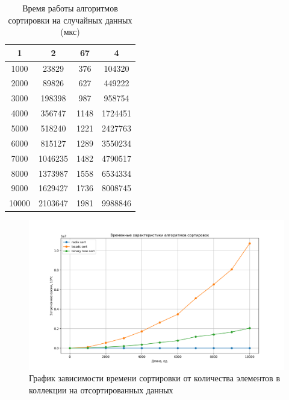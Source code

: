 \begin{table}[h]
	\begin{center}
		\captionsetup{justification=raggedright,singlelinecheck=off}
		\caption{ Время работы алгоритмов сортировки на случайных данных (мкс)}
		\label{tbl:random}
		\begin{tabular}{|c|c|c|c|}
			\hline
			1 & 2 & 67 & 4\\
			\hline
			1000 & 23829 & 376 & 104320\\
			\hline
			2000 & 89826 & 627 & 449222\\
			\hline
			3000 & 198398 & 987 & 958754\\
			\hline
			4000 & 356747 & 1148 & 1724451\\
			\hline
			5000 & 518240 & 1221 & 2427763\\
			\hline
			6000 & 815127 & 1289 & 3550234\\
			\hline
			7000 & 1046235 & 1482 & 4790517\\
			\hline
			8000 & 1373987 & 1558 & 6534334\\
			\hline
			9000 & 1629427 & 1736 & 8008745\\
			\hline
			10000 & 2103647 & 1981 & 9988846\\
			\hline
		\end{tabular}
	\end{center}
	
\end{table}
\clearpage

\begin{figure}[h!]
\centering
\includegraphics[width=1\linewidth]{inc/img/sort_time_graph_0.png}
\caption{График зависимости времени сортировки от количества элементов в коллекции на отсортированных данных}
\label{gra:sor}
\end{figure}

